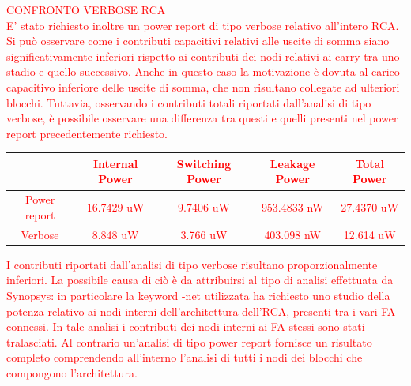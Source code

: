 \documentclass[11pt,  english, makeidx, a4paper, titlepage, oneside]{book}
\begin{document}
\newpage
\textcolor{red}{CONFRONTO VERBOSE RCA
\\
E' stato richiesto inoltre un power report di tipo verbose relativo all'intero RCA. Si può osservare come i contributi capacitivi relativi
alle uscite di somma siano significativamente inferiori rispetto ai contributi dei nodi relativi ai carry tra uno stadio e quello successivo.
Anche in questo caso la motivazione è dovuta al carico capacitivo inferiore delle uscite di somma, che non risultano collegate ad ulteriori
blocchi. Tuttavia, osservando i contributi totali riportati dall'analisi di tipo verbose, è possibile osservare una differenza tra questi e 
quelli presenti nel power report precedentemente richiesto.
\\
\begin{center}
	\begin{tabular}{|c|c|c|c|c|}
	\hline
	& Internal Power & Switching Power & Leakage Power & Total Power \\ 
	\hline
	Power report & 16.7429 uW & 9.7406 uW & 953.4833 nW & 27.4370 uW \\
	\hline
	Verbose & 8.848 uW & 3.766 uW & 403.098 nW & 12.614 uW \\
	\hline
	\end{tabular}
\end{center}
\vspace{0.3cm}
I contributi riportati dall'analisi di tipo verbose risultano proporzionalmente inferiori. La possibile causa di ciò è da attribuirsi al tipo
di analisi effettuata da Synopsys: in particolare la keyword -net utilizzata ha richiesto uno studio della potenza relativo ai nodi interni
dell'architettura dell'RCA, presenti tra i vari FA connessi. In tale analisi i contributi dei nodi interni ai FA stessi sono stati
tralasciati. Al contrario un'analisi di tipo power report fornisce un risultato completo comprendendo all'interno l'analisi di tutti i nodi dei
blocchi che compongono l'architettura.
}
\newpage
\end{document}
